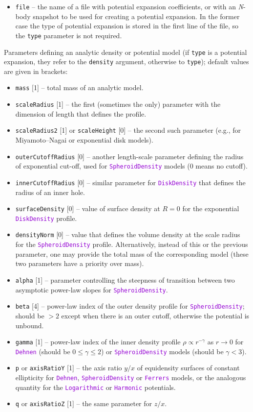 \documentclass[12pt]{article}
\newcommand{\Nbody}{\textsl{N}-body\xspace}
\newcommand{\ttt}[1]{\textcolor{darkviolet}{\texttt{#1}}}
\newcommand{\ppp}[1]{\textcolor{darkolive} {\texttt{#1}}}
\begin{document}
\begin{itemize}
\item \ppp{file} -- the name of a file with potential expansion coefficients, or with an \Nbody snapshot to be used for creating a potential expansion. In the former case the type of potential expansion is stored in the first line of the file, so the \ppp{type} parameter is not required.
\end{itemize}
Parameters defining an analytic density or potential model (if \ppp{type} is a potential expansion, they refer to the \ppp{density} argument, otherwise to \ppp{type}); default values are given in brackets:
\begin{itemize}
\item \ppp{mass} [1] -- total mass of an analytic model.
\item \ppp{scaleRadius} [1] -- the first (sometimes the only) parameter with the dimension of length that defines the profile.
\item \ppp{scaleRadius2} [1] or \ppp{scaleHeight} [0] -- the second such parameter (e.g., for Miyamoto--Nagai or exponential disk models).
\item \ppp{outerCutoffRadius} [0] -- another length-scale parameter defining the radius of exponential cut-off, used for \ttt{SpheroidDensity} models (0 means no cutoff).
\item \ppp{innerCutoffRadius} [0] -- similar parameter for \ttt{DiskDensity} that defines the radius of an inner hole.
\item \ppp{surfaceDensity} [0] -- value of surface density at $R=0$ for the exponential \ttt{DiskDensity} profile.
\item \ppp{densityNorm} [0] -- value that defines the volume density at the scale radius for the \ttt{SpheroidDensity} profile. Alternatively, instead of this or the previous parameter, one may provide the total mass of the corresponding model (these two parameters have a priority over mass).
\item \ppp{alpha} [1] -- parameter controlling the steepness of transition between two asymptotic power-law slopes for \ttt{SpheroidDensity}.
\item \ppp{beta} [4] -- power-law index of the outer density profile for \ttt{SpheroidDensity}; should be $>2$ except when there is an outer cutoff, otherwise the potential is unbound.
\item \ppp{gamma} [1] -- power-law index of the inner density profile $\rho \propto r^{-\gamma}$ as $r\to 0$ for \ttt{Dehnen} (should be $0\le\gamma\le 2$) or \ttt{SpheroidDensity} models (should be $\gamma<3$).
\item \ppp{p} or \ppp{axisRatioY} [1] -- the axis ratio $y/x$ of equidensity surfaces of constant ellipticity for \ttt{Dehnen}, \ttt{SpheroidDensity} or \ttt{Ferrers} models, or the analogous quantity for the \ttt{Logarithmic} or \ttt{Harmonic} potentials.
\item \ppp{q} or \ppp{axisRatioZ} [1] -- the same parameter for $z/x$. 
\end{itemize}
\end{document}
